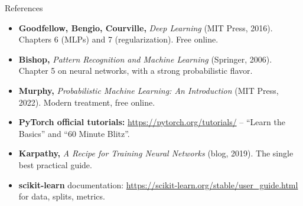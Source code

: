 \documentclass[aspectratio=169,10pt]{beamer}
\begin{document}
\begin{frame}{References}
\footnotesize
\begin{itemize}
  \item \textbf{Goodfellow, Bengio, Courville,} \emph{Deep Learning} (MIT Press, 2016). Chapters 6 (MLPs) and 7 (regularization). Free online.
  \item \textbf{Bishop,} \emph{Pattern Recognition and Machine Learning} (Springer, 2006). Chapter 5 on neural networks, with a strong probabilistic flavor.
  \item \textbf{Murphy,} \emph{Probabilistic Machine Learning: An Introduction} (MIT Press, 2022). Modern treatment, free online.
  \item \textbf{PyTorch official tutorials:} \url{https://pytorch.org/tutorials/} -- ``Learn the Basics'' and ``60 Minute Blitz''.
  \item \textbf{Karpathy,} \emph{A Recipe for Training Neural Networks} (blog, 2019). The single best practical guide.
  \item \textbf{scikit-learn} documentation: \url{https://scikit-learn.org/stable/user_guide.html} for data, splits, metrics.
\end{itemize}
\end{frame}
\end{document}
